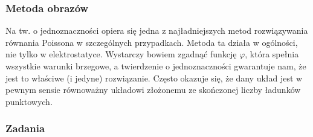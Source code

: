\documentclass[../main.tex]{subfiles}
\begin{document}
\subsubsection{Metoda obrazów}
Na tw. o jednoznaczności opiera się jedna z najładniejszych metod rozwiązywania równania Poissona w
szczególnych przypadkach. Metoda ta działa w ogólności, nie tylko w elektrostatyce. Wystarczy bowiem
zgadnąć funkcję \(\varphi\), która spełnia wszystkie warunki brzegowe, a twierdzenie o
jednoznaczności gwarantuje nam, że jest to właściwe (i jedyne) rozwiązanie. Często okazuje się, że
dany układ jest w pewnym sensie równoważny układowi złożonemu ze skończonej liczby ładunków
punktowych.
\subsubsection*{Zadania}
\end{document}
